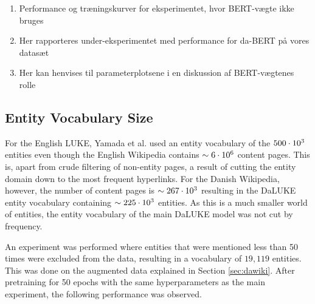 \documentclass[main.tex]{subfiles}
\begin{document}
\begin{enumerate}
    \item Performance og træningskurver for eksperimentet, hvor BERT-vægte ikke bruges
    \item Her rapporteres under-eksperimentet med performance for da-BERT på vores datasæt
    \item Her kan henvises til parameterplotsene i en diskussion af BERT-vægtenes rolle
\end{enumerate}

\subsection{Entity Vocabulary Size}
For the English LUKE, Yamada et al. used an entity vocabulary of the $500\cdot10^{3}$ entities \cite[Sec. 3.4]{yamada2020luke} even though the English Wikipedia contains $\sim 6\cdot10^{6}$ content pages\footnotemark.
This is, apart from crude filtering of non-entity pages, a result of cutting the entity domain down to the most frequent hyperlinks.
For the Danish Wikipedia, however, the number of content pages is $\sim 267\cdot10^{3}$ \footnotemark resulting in the DaLUKE entity vocabulary containing $\sim 225\cdot10^{3}$ entities.
As this is a much smaller world of entities, the entity vocabulary of the main DaLUKE model was not cut by frequency.

An experiment was performed where entities that were mentioned less than 50 times were excluded from the data, resulting in a vocabulary of $19,119$ entities.
This was done on the augmented data explained in Section \ref{sec:dawiki}.
After pretraining for 50 epochs with the same hyperparameters as the main experiment, the following performance was observed.
\end{document}

